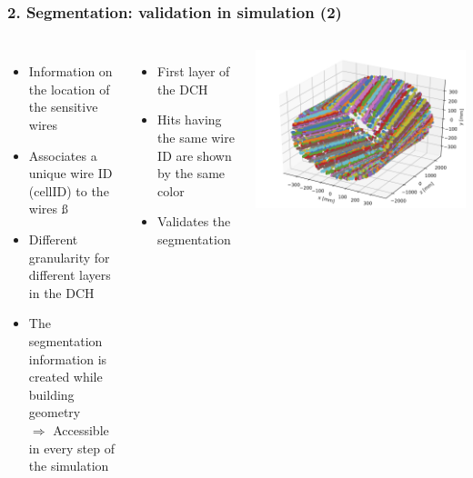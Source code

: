 \documentclass[aspectratio=169, hyperref={colorlinks=true,pdfpagelabels=false,linkcolor=black}, xcolor=dvipsnames,10pt]{beamer}
\begin{document}
\begin{frame}
	\frametitle{2. Segmentation: validation in simulation (2)}
		
	\begin{columns}[t]
		\begin{itemize}
		\item Information on the location of the sensitive wires \vspace{0.2cm}
		\item Associates a unique wire ID (cellID) to the wires \vspace{0.2cm}ß
		\item Different granularity for different layers in the DCH \vspace{0.2cm}
		\item The segmentation information is created while building geometry \vspace{0.2cm} \\
			$\Rightarrow$ Accessible in every step of the simulation
		\end{itemize}
	
		\begin{itemize}
		\item First layer of the DCH
		\item Hits having the same wire ID are shown by the same color
		\item Validates the segmentation
		\end{itemize}
		\centering
		\includegraphics[width=\textwidth]{../figures/allHits}
	\end{columns}
	
\end{frame}
\end{document}
